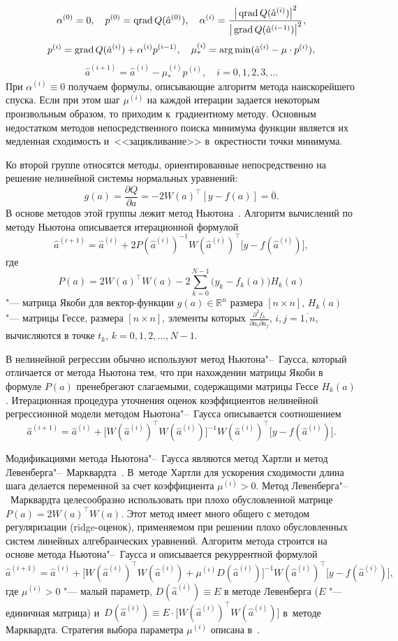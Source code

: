 $$
\alpha^{(0)}=0, \quad p^{(0)}=\mathop{\rm qrad} Q(\hat{a}^{(0)}), \quad \alpha^{(i)}=\dfrac{\big|\mathop{\rm qrad} Q(\hat{a}^{(i)})\big|^2}{\big|\mathop{\rm grad} Q(\hat{a}^{(i-1)})\big|^2}, 
$$
$$
p^{(i)}=\mathop{\rm grad} Q(\hat{a}^{(i)})+\alpha^{(i)}p^{(i-1)}, \quad  \mu_*^{(i)}=\mathrm{arg} \min (\hat{a}^{(i)}-\mu\cdot p^{(i)}), 
$$
$$
\hat{a}^{(i+1)}=\hat{a}^{(i)}-\mu_*^{(i)}p^{(i)}, \quad i=0,1,2,3,\dots
$$
При $\alpha^{(i)}\equiv 0$  получаем формулы, описывающие алгоритм метода наискорейшего спуска. 
Если при этом шаг $\mu^{(i)}$ на каждой итерации задается некоторым произвольным образом, то приходим к~градиентному методу. 
Основным недостатком методов непосредственного поиска минимума функции является их медленная сходимость и~<<зацикливание>> в~окрестности точки минимума. 

Ко второй группе относятся методы, ориентированные непосредственно на решение нелинейной системы нормальных уравнений: 
$$
g(a)=\dfrac{\partial Q}{\partial a}=-2W(a)^{\top}[y-f(a)]=\overline{0}.
$$ 
В основе методов этой группы лежит метод Ньютона~\cite{zot:2,zot:3}. 
Алгоритм вычислений по методу Ньютона описывается итерационной формулой 
$$
\hat{a}^{(i+1)}=\hat{a}^{(i)}+2P (\hat{a}^{(i)} )^{-1} W (\hat{a}^{(i)})^{\top}\bigl[y-f(\hat{a}^{(i)})\bigr],
$$
где 
$$P(a)=2W(a)^{\top}W(a)-2\sum_{k=0}^{N-1} \big(y_k-f_k (a)\big)H_k(a)$$ "--- матрица Якоби для вектор-функции $g(a) \in \mathbb R^n$ размера $[n {\times} n]$, 
$H_k(a)$ "--- матрицы Гессе, размера $[n {\times} n]$, элементы которых 
$\frac{\partial^2 f_k}{\partial a_i \partial a_j}$, $i,j=\overline{1,n}$, вычисляются в точке $t_k$, $k=0,1,2,\dots,N-1$.

В нелинейной регрессии обычно используют метод Ньютона"--~Гаусса, который отличается от метода Ньютона тем, что при нахождении матрицы Якоби в формуле $P(a)$ пренебрегают слагаемыми, содержащими матрицы Гессе $H_k(a)$. 
Итерационная процедура уточнения оценок коэффициентов нелинейной регрессионной модели методом Ньютона"--~Гаусса описывается соотношением
$$
\hat{a}^{(i+1)}=\hat{a}^{(i)}+ \bigl[W(\hat{a}^{(i)})^{\top}W(\hat{a}^{(i)})\bigr]^{-1}W(\hat{a}^{(i)})^{\top}
\bigl[y-f(\hat{a}^{(i)})\bigr].
$$

Модификациями метода Ньютона"--~Гаусса являются метод Хартли и метод Левенберга"--~Марквардта~\cite{zot:3,zot:8,zot:9}. 
В~методе Хартли для ускорения сходимости длина шага делается переменной за счет коэффициента $\mu^{(i)}>0$. 
Метод Левенберга"--~Марквардта целесообразно использовать при плохо обусловленной матрице $P(a)=2W(a)^{\top}W(a)$. Этот метод имеет много общего с методом регуляризации (ridge-оценок), 
применяемом при решении плохо обусловленных систем линейных алгебраических уравнений. Алгоритм метода строится на основе метода Ньютона"--~Гаусса и описывается рекуррентной формулой
$$
\hat{a}^{(i+1)}=\hat{a}^{(i)}+\bigl[W(\hat{a}^{(i)})^{\top}W(\hat{a}^{(i)})+
\mu^{(i)}D(\hat{a}^{(i)})\bigr]^{-1}W(\hat{a}^{(i)})^{\top}\bigl[y-f(\hat{a}^{(i)})\bigr],
$$
где $\mu^{(i)}>0$ "--- малый параметр, 
$D(\hat{a}^{(i)})\equiv E$ в методе Левенберга ($E$ "--- единичная матрица) 
и~$D(\hat{a}^{(i)})\equiv E\cdot \bigl[W(\hat{a}^{(i)})^{\top}W(\hat{a}^{(i)})\bigr]$ в~методе Марквардта. 
Стратегия выбора параметра $\mu^{(i)}$ описана в~\cite{zot:3}.

